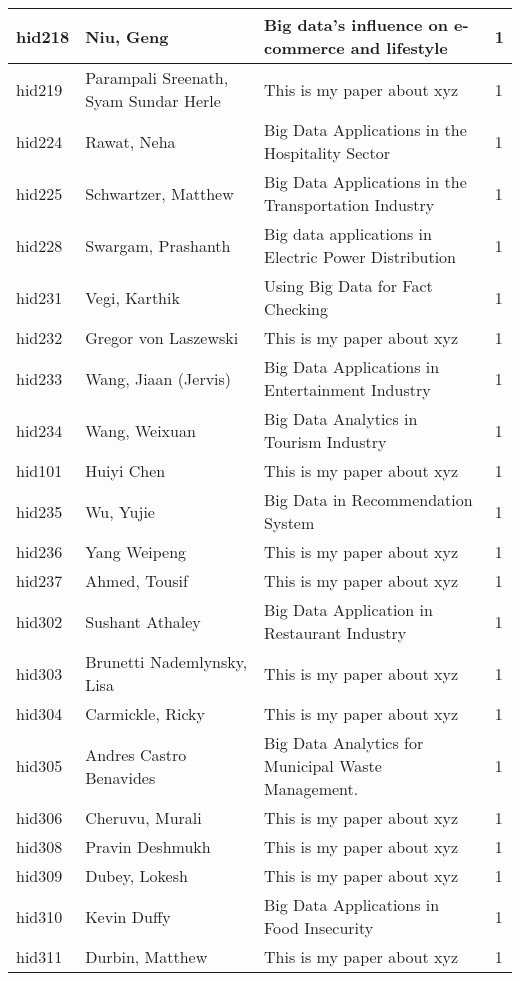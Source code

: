 \documentclass[12pt]{article}
\begin{document}
\begin{footnotesize}
\begin{longtable}{|p{1cm}p{5cm}p{9cm}p{1cm}|}
\hline
hid218 & Niu, Geng & Big data's influence on e-commerce and lifestyle & 1 \\
\hline
hid219 & Parampali Sreenath, Syam Sundar Herle & This is my paper about xyz & 1 \\
\hline
hid224 & Rawat, Neha & Big Data Applications in the Hospitality Sector & 1 \\
\hline
hid225 & Schwartzer, Matthew & Big Data Applications in the Transportation Industry & 1 \\
\hline
hid228 & Swargam, Prashanth & Big data applications in Electric Power Distribution & 1 \\
\hline
hid231 & Vegi, Karthik & Using Big Data for Fact Checking & 1 \\
\hline
hid232 & Gregor von Laszewski & This is my paper about xyz & 1 \\
\hline
hid233 & Wang, Jiaan (Jervis) & Big Data Applications in Entertainment Industry & 1 \\
\hline
hid234 & Wang, Weixuan & Big Data Analytics in Tourism Industry & 1 \\
\hline
hid101 & Huiyi Chen & This is my paper about xyz & 1 \\
\hline
hid235 & Wu, Yujie & Big Data in Recommendation System & 1 \\
\hline
hid236 & Yang Weipeng & This is my paper about xyz & 1 \\
\hline
hid237 & Ahmed, Tousif & This is my paper about xyz & 1 \\
\hline
hid302 & Sushant Athaley & Big Data Application in Restaurant Industry & 1 \\
\hline
hid303 & Brunetti Nademlynsky, Lisa & This is my paper about xyz & 1 \\
\hline
hid304 & Carmickle, Ricky & This is my paper about xyz & 1 \\
\hline
hid305 & Andres Castro Benavides & Big Data Analytics for Municipal Waste Management. & 1 \\
\hline
hid306 & Cheruvu, Murali & This is my paper about xyz & 1 \\
\hline
hid308 & Pravin Deshmukh & This is my paper about xyz & 1 \\
\hline
hid309 & Dubey, Lokesh & This is my paper about xyz & 1 \\
\hline
hid310 & Kevin Duffy & Big Data Applications in Food Insecurity & 1 \\
\hline
hid311 & Durbin, Matthew & This is my paper about xyz & 1 \\
\hline

\end{longtable}
\end{footnotesize}
\end{document}
